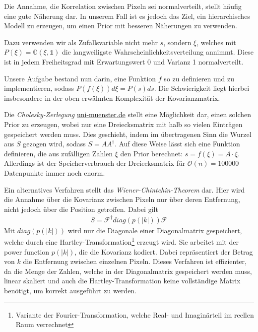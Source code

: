 \documentclass[]{dsadokumentation}
\begin{document}
Die Annahme, die Korrelation zwischen Pixeln sei normalverteilt, stellt häufig eine gute Näherung dar. In unserem Fall ist es jedoch das Ziel, ein hierarchisches Modell zu erzeugen, um einen Prior mit besseren Näherungen zu verwenden.

Dazu verwenden wir als Zufallsvariable nicht mehr $s$, sondern $\xi$, welches mit $P(\xi) = \mathbb{G}(\xi, \mathds{1})$ die langweiligste Wahrscheinlichkeitsverteilung annimmt. Diese ist in jedem Freiheitsgrad mit Erwartungswert 0 und Varianz 1 normalverteilt.

Unsere Aufgabe bestand nun darin, eine Funktion $f$ so zu definieren und zu implementieren, sodass $P(f(\xi)) d \xi = P(s) ds$. Die Schwierigkeit liegt hierbei insbesondere in der oben erwähnten Komplexität der Kovarianzmatrix.

Die \emph{Cholesky-Zerlegung} \href{https://www.uni-muenster.de/AMM/num/Vorlesungen/Numerik1_WS06/loesungen06/Prog_cholesky.pdf}{uni-muenster.de}
stellt eine Möglichkeit dar, einen solchen Prior zu erzeugen, wobei nur eine Dreiecksmatrix mit halb so vielen Einträgen gespeichert werden muss. Dies geschieht, indem im übertragenen Sinn die Wurzel aus $S$ gezogen wird, sodass $S=A A^{\dagger}$. Auf diese Weise lässt sich eine Funktion definieren, die aus zufälligen Zahlen $\xi$ den Prior berechnet: $s = f(\xi) = A \cdot \xi$. Allerdings ist der Speicherverbrauch der Dreiecksmatrix für $\mathcal{O}(n) = 100 000$ Datenpunkte immer noch enorm.

Ein alternatives Verfahren stellt das \emph{Wiener-Chintchin-Theorem} dar. Hier wird die Annahme über die Kovarianz zwischen Pixeln nur über deren Entfernung, nicht jedoch über die Position getroffen. Dabei gilt
\begin{eqnarray}
S= \mathcal{F}^{\dagger} diag(p(|k|)) \mathcal{F}
\end{eqnarray}
Mit $diag(p(|k|))$ wird nur die Diagonale einer Diagonalmatrix gespeichert, welche durch eine Hartley-Transformation\footnote{Variante der Fourier-Transformation, welche Real- und Imaginärteil im reellen Raum verrechnet} erzeugt wird. Sie arbeitet mit der power function $p(|k|)$, die die Kovarianz kodiert. Dabei repräsentiert der Betrag von $k$ die Entfernung zwischen einzelnen Pixeln. Dieses Verfahren ist effizienter, da die Menge der Zahlen, welche in der Diagonalmatrix gespeichert werden muss, linear skaliert und auch die Hartley-Transformation keine vollständige Matrix benötigt, um korrekt ausgeführt zu werden.
\end{document}
